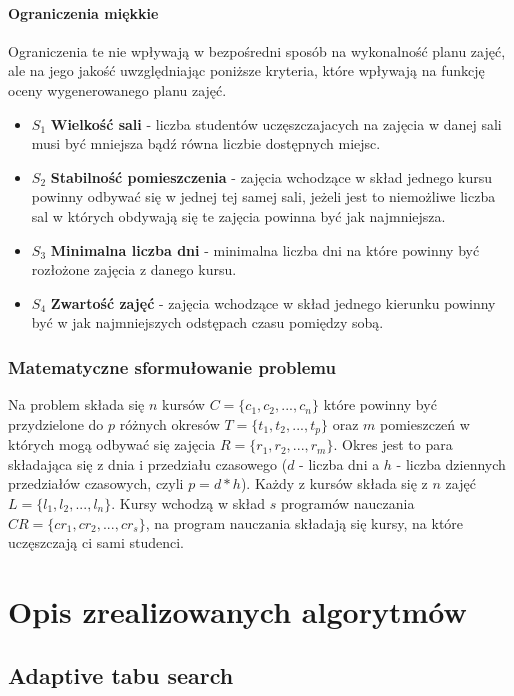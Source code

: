 \documentclass[11pt]{report}
\begin{document}
\subsubsection{Ograniczenia miękkie}
Ograniczenia te nie wpływają w bezpośredni sposób na wykonalność planu zajęć, ale na jego jakość uwzględniając poniższe kryteria, które wpływają na funkcję oceny wygenerowanego planu zajęć.
\begin{itemize}
\item  ${S_{1}}$ \textbf{Wielkość sali} - liczba studentów uczęszczajacych na zajęcia w danej sali musi być mniejsza bądź równa liczbie dostępnych miejsc.
\item  ${S_{2}}$ \textbf{Stabilność pomieszczenia} - zajęcia wchodzące w skład jednego kursu powinny odbywać się w jednej tej samej sali, jeżeli jest to niemożliwe liczba sal w których obdywają się te zajęcia powinna być jak najmniejsza.
\item  ${S_{3}}$ \textbf{Minimalna liczba dni} - minimalna liczba dni na które powinny być rozłożone zajęcia z danego kursu.
\item  ${S_{4}}$ \textbf{Zwartość zajęć} - zajęcia wchodzące w skład jednego kierunku powinny być w jak najmniejszych odstępach czasu pomiędzy sobą.
\end{itemize}
\subsection{Matematyczne sformułowanie problemu} \cite{tabu}
\par Na problem składa się ${n}$ kursów ${C = \{c_{1}, c_{2},...,c_{n}\}}$ które powinny być przydzielone do ${p}$ różnych okresów ${T = \{t_{1}, t_{2},...,t_{p}\}}$ oraz ${m}$ pomieszczeń w których mogą odbywać się zajęcia ${R = \{r_{1}, r_{2},...,r_{m}\}}$. Okres jest to para składająca się z dnia i przedziału czasowego (${d}$ - liczba dni a ${h}$ - liczba dziennych przedziałów czasowych, czyli ${p = d * h}$). Każdy z kursów składa się z ${n}$ zajęć ${L = \{l_{1},l_{2},...,l_{n}\}}$. Kursy wchodzą w skład ${s}$ programów nauczania ${CR = \{cr_{1}, cr_{2}, ..., cr_{s}\}}$, na program nauczania składają się kursy, na które uczęszczają ci sami studenci. 

\chapter{Opis zrealizowanych algorytmów}
\section{Adaptive tabu search}
\end{document}
